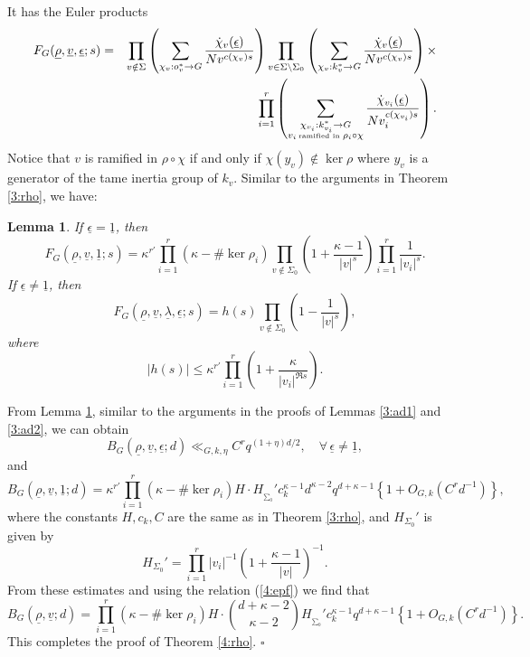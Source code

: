 \documentclass[12pt]{amsart}
\theoremstyle{plain}
\newtheorem{lemma}{Lemma}
\begin{document}
It has the Euler products
\begin{eqnarray*} F_G({\underline{{\rho}}},{\underline{{v}}},{\underline{{\epsilon}}};s)&=&
\prod_{v \notin \Sigma }\left(\sum_{\chi_v:o_v^* \to G} \frac{\dot{\chi}_v({\underline{{\epsilon}}})}{Nv^{c(\chi_v)s}}\right) \prod_{v \in \Sigma \setminus \Sigma_0}\left(\sum_{\chi_v:k_v^* \to G} \frac{\dot{\chi}_v({\underline{{\epsilon}}})}{Nv^{c(\chi_v)s}}\right) \times \\
&& \prod_{i=1 }^r\left(\sum_{\substack{\chi_{v_i}:k_{v_i}^* \to G\\
v_i \, \mbox{\tiny ramified in } \rho_i \circ \chi}}  \frac{\dot{\chi}_{v_i}({\underline{{\epsilon}}})}{Nv_i^{c(\chi_{v_i})s}}
\right).\end{eqnarray*}
Notice that $v$ is ramified in $\rho \circ \chi$ if and only if $\chi(y_{v}) \notin \ker \rho$ where $y_v$ is a generator of the tame inertia group of $k_v$. Similar to the arguments in Theorem \ref{3:rho}, we have:

\begin{lemma} \label{4:fg} If ${\underline{{\epsilon}}}={\underline{{1}}}$, then
\[F_G({\underline{{\rho}}},{\underline{{v}}},{\underline{{1}}};s)=\kappa^{r'} \prod_{i=1}^r \left(\kappa-\# \ker \rho_i\right) \prod_{v \notin \Sigma_0} \left(1+\frac{\kappa-1}{|v|^{s}}\right) \prod_{i=1}^r \frac{1}{|v_i|^{s}}. \]
If ${\underline{{\epsilon}}} \ne {\underline{{1}}}$, then
\[F_G({\underline{{\rho}}},{\underline{{v}}},{\underline{{\lambda}}},{\underline{{\epsilon}}};s)= h(s) \prod_{v \notin \Sigma_0} \left(1-\frac{1}{|v|^{s}}\right) ,  \]
where
\[|h(s)| \le \kappa^{r'} \prod_{i=1}^r \left(1+\frac{\kappa}{|v_i|^{\Re s}}\right). \]
\end{lemma}
From Lemma \ref{4:fg}, similar to the arguments in the proofs of Lemmas \ref{3:ad1} and \ref{3:ad2}, we can obtain
\[{B_{G}({\underline{{\rho}}},{\underline{{v}}},{\underline{{\epsilon}}};d)} \ll_{G,k,\eta} C^{r} q^{(1+\eta)d/2}, \quad \forall \, {\underline{{\epsilon}}} \ne {\underline{{1}}}, \]
and
\[{B_{G}({\underline{{\rho}}},{\underline{{v}}},{\underline{{1}}};d)}=\kappa^{r'} \prod_{i=1}^r \left(\kappa-\# \ker \rho_i\right) H \cdot H_{_{\sum_0}}'c_k^{\kappa-1}d^{\kappa-2} q^{d+\kappa-1} \left\{1+O_{G,k}\left(C^rd^{-1}\right)\right\}, \]
where the constants $H,c_k,C$ are the same as in Theorem \ref{3:rho}, and $H_{\Sigma_0}'$ is given by
\[H_{\Sigma_0}'=\prod_{i=1}^r |v_i|^{-1} \left(1+\frac{\kappa-1}{|v|}\right)^{-1}. \]
From these estimates and using the relation (\ref{4:epf}) we find that
\[{B_{G}({\underline{{\rho}}},{\underline{{v}}};d)}=\prod_{i=1}^r \left(\kappa-\# \ker \rho_i\right) H \cdot \binom{d+\kappa-2}{\kappa-2}  H_{_{\sum_0}}'c_k^{\kappa-1}q^{d+\kappa-1} \left\{1+O_{G,k}\left(C^rd^{-1}\right)\right\}. \]
This completes the proof of Theorem \ref{4:rho}. \quad $\square$
\end{document}
